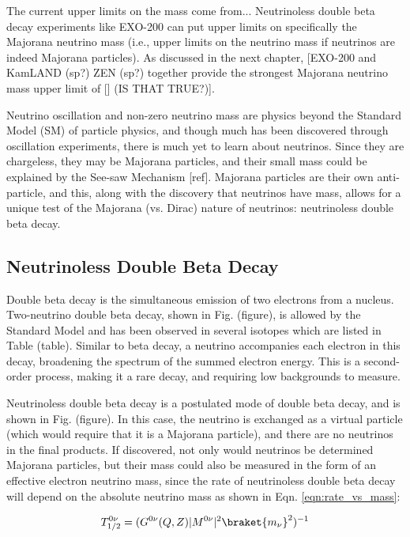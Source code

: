 The current upper limits on the mass come from...
Neutrinoless double beta decay experiments like EXO-200 can put upper limits on specifically the Majorana neutrino mass (i.e., upper limits on the neutrino mass if neutrinos are indeed Majorana particles).  As discussed in the next chapter, [EXO-200 and KamLAND (sp?) ZEN (sp?) together provide the strongest Majorana neutrino mass upper limit of [] (IS THAT TRUE?)].

Neutrino oscillation and non-zero neutrino mass are physics beyond the Standard Model (SM) of particle physics, and though much has been discovered through oscillation experiments, there is much yet to learn about neutrinos. Since they are chargeless, they may be Majorana particles, and their small mass could be explained by the See-saw Mechanism [ref]. Majorana particles are their own anti-particle, and this, along with the discovery that neutrinos have mass, allows for a unique test of the Majorana (vs. Dirac) nature of neutrinos: neutrinoless double beta decay.

\subsection{Neutrinoless Double Beta Decay}

Double beta decay is the simultaneous emission of two electrons from a nucleus.  Two-neutrino double beta decay, shown in Fig. (figure), is allowed by the Standard Model and has been observed in several isotopes which are listed in Table (table).  Similar to beta decay, a neutrino accompanies each electron in this decay, broadening the spectrum of the summed electron energy. This is a second-order process, making it a rare decay, and requiring low backgrounds to measure.

Neutrinoless double beta decay is a postulated mode of double beta decay, and is shown in Fig. (figure). In this case, the neutrino is exchanged as a virtual particle (which would require that it is a Majorana particle), and there are no neutrinos in the final products. If discovered, not only would neutrinos be determined Majorana particles, but their mass could also be measured in the form of an effective electron neutrino mass, since the rate of neutrinoless double beta decay will depend on the absolute neutrino mass as shown in Eqn. \ref{eqn:rate_vs_mass}:

\begin{equation}
T_{1/2}^{0\nu} = (G^{0\nu}(Q,Z)|M^{0\nu}|^{2}\braket{m_{\nu}}^{2})^{-1}
\label{eqn:rate_vs_mass}
\end{equation}

